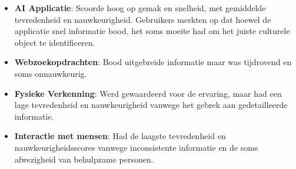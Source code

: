 \begin{itemize}
    \item \textbf{AI Applicatie}: Scoorde hoog op gemak en snelheid, met gemiddelde tevredenheid en nauwkeurigheid. Gebruikers merkten op dat hoewel de applicatie snel informatie bood, het soms moeite had om het juiste culturele object te identificeren.
    \item \textbf{Webzoekopdrachten}: Bood uitgebreide informatie maar was tijdrovend en soms onnauwkeurig.
    \item \textbf{Fysieke Verkenning}: Werd gewaardeerd voor de ervaring, maar had een lage tevredenheid en nauwkeurigheid vanwege het gebrek aan gedetailleerde informatie.
    \item \textbf{Interactie met mensen}: Had de laagste tevredenheid en nauwkeurigheidsscores vanwege inconsistente informatie en de soms afwezigheid van behulpzame personen.
\end{itemize}


